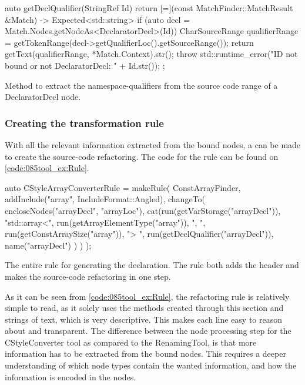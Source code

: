 \begin{listing}[H]
    \begin{cppcode}
auto getDeclQualifier(StringRef Id) {
    return [=](const MatchFinder::MatchResult &Match) -> Expected<std::string> {
        if (auto decl = Match.Nodes.getNodeAs<DeclaratorDecl>(Id)) {
            CharSourceRange qualifierRange = getTokenRange(decl->getQualifierLoc().getSourceRange());
            return getText(qualifierRange, *Match.Context).str();
        }
        throw std::runtime_error("ID not bound or not DeclaratorDecl: " + Id.str());
    };
}
    \end{cppcode}
    \caption{Method to extract the namespace-qualifiers from the source code range of a DeclaratorDecl node.}
    \label{code:085tool_ex:DeclaratorQualif}
\end{listing}

\subsubsection*{Creating the transformation rule}

With all the relevant information extracted from the bound nodes, a  can be made to create the source-code refactoring. The code for the rule can be found on \cref{code:085tool_ex:Rule}.

\begin{listing}[H]
    \begin{cppcode}
auto CStyleArrayConverterRule = makeRule(
    ConstArrayFinder,
    {
        addInclude("array", IncludeFormat::Angled),
        changeTo(
            encloseNodes("arrayDecl", "arrayLoc"),
            cat(run(getVarStorage("arrayDecl")),
                "std::array<",
                run(getArrayElementType("array")),
                ", ",
                run(getConstArraySize("array")),
                "> ",
                run(getDeclQualifier("arrayDecl")),
                name("arrayDecl")
            )
        )
    });
    \end{cppcode}
    \caption{The entire rule for generating the  declaration. The rule both adds the  header and makes the source-code refactoring in one step.}
    \label{code:085tool_ex:Rule}
\end{listing}

As it can be seen from \cref{code:085tool_ex:Rule}, the refactoring rule is relatively simple to read, as it solely uses the methods created through this section and strings of text, which is very descriptive. This makes each line easy to reason about and transparent. The difference between the node processing step for the CStyleConverter tool as compared to the RenamingTool, is that more information has to be extracted from the bound nodes. This requires a deeper understanding of which node types contain the wanted information, and how the information is encoded in the nodes.


